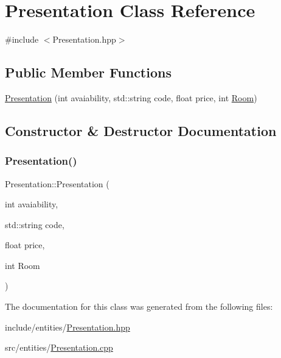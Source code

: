 \hypertarget{class_presentation}{}\section{Presentation Class Reference}
\label{class_presentation}


{\ttfamily \#include $<$Presentation.\+hpp$>$}

\subsection*{Public Member Functions}
\begin{DoxyCompactItemize}
\item 
\mbox{\hyperlink{class_presentation_a41349f0d0cfdf8f7de5fa6bfe12b752c}{Presentation}} (int avaiability, std\+::string code, float price, int \mbox{\hyperlink{class_room}{Room}})
\end{DoxyCompactItemize}


\subsection{Constructor \& Destructor Documentation}
\mbox{\label{class_presentation_a41349f0d0cfdf8f7de5fa6bfe12b752c}} 
\subsubsection{\texorpdfstring{Presentation()}{Presentation()}}
{\footnotesize\ttfamily Presentation\+::\+Presentation (\begin{DoxyParamCaption}\item[{int}]{avaiability,  }\item[{std\+::string}]{code,  }\item[{float}]{price,  }\item[{int}]{Room }\end{DoxyParamCaption})}



The documentation for this class was generated from the following files\+:\begin{DoxyCompactItemize}
\item 
include/entities/\mbox{\hyperlink{_presentation_8hpp}{Presentation.\+hpp}}\item 
src/entities/\mbox{\hyperlink{_presentation_8cpp}{Presentation.\+cpp}}\end{DoxyCompactItemize}
